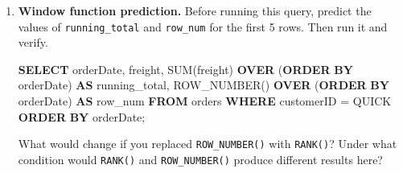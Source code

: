 \documentclass[
  letterpaper,
  DIV=11,
  numbers=noendperiod]{scrreprt}
\newenvironment{Shaded}{\begin{snugshade}}{\end{snugshade}}
\newcommand{\FunctionTok}[1]{\textcolor[rgb]{0.28,0.35,0.67}{#1}}
\newcommand{\KeywordTok}[1]{\textcolor[rgb]{0.00,0.23,0.31}{\textbf{#1}}}
\newcommand{\NormalTok}[1]{\textcolor[rgb]{0.00,0.23,0.31}{#1}}
\newcommand{\OperatorTok}[1]{\textcolor[rgb]{0.37,0.37,0.37}{#1}}
\newcommand{\StringTok}[1]{\textcolor[rgb]{0.13,0.47,0.30}{#1}}
\begin{document}
\begin{enumerate}
  \begin{codelisting}

  \caption{\texttt{duckdb}}

\begin{Shaded}
\begin{Highlighting}[]
\KeywordTok{SELECT}
\NormalTok{    c.categoryName,}
\NormalTok{    p.productName,}
    \FunctionTok{MAX}\NormalTok{(p.unitPrice) }\KeywordTok{AS}\NormalTok{ max\_price}
\KeywordTok{FROM}\NormalTok{ products }\KeywordTok{AS}\NormalTok{ p}
\KeywordTok{INNER} \KeywordTok{JOIN}\NormalTok{ categories }\KeywordTok{AS}\NormalTok{ c }\KeywordTok{ON}\NormalTok{ p.categoryID }\OperatorTok{=}\NormalTok{ c.categoryID}
\KeywordTok{GROUP} \KeywordTok{BY}\NormalTok{ c.categoryName, p.productName}
\KeywordTok{ORDER} \KeywordTok{BY}\NormalTok{ max\_price }\KeywordTok{DESC}\NormalTok{;}
\end{Highlighting}
\end{Shaded}

  \end{codelisting}

  Write a corrected version using a window function, and explain why
  \texttt{GROUP\ BY} alone can't solve this problem cleanly.
\item
  \textbf{Window function prediction.} Before running this query,
  predict the values of \texttt{running\_total} and \texttt{row\_num}
  for the first 5 rows. Then run it and verify.

  \begin{codelisting}

  \caption{\texttt{duckdb}}

\begin{Shaded}
\begin{Highlighting}[]
\KeywordTok{SELECT}
\NormalTok{    orderDate,}
\NormalTok{    freight,}
    \FunctionTok{SUM}\NormalTok{(freight) }\KeywordTok{OVER}\NormalTok{ (}\KeywordTok{ORDER} \KeywordTok{BY}\NormalTok{ orderDate) }\KeywordTok{AS}\NormalTok{ running\_total,}
    \FunctionTok{ROW\_NUMBER}\NormalTok{() }\KeywordTok{OVER}\NormalTok{ (}\KeywordTok{ORDER} \KeywordTok{BY}\NormalTok{ orderDate) }\KeywordTok{AS}\NormalTok{ row\_num}
\KeywordTok{FROM}\NormalTok{ orders}
\KeywordTok{WHERE}\NormalTok{ customerID }\OperatorTok{=} \StringTok{\textquotesingle{}QUICK\textquotesingle{}}
\KeywordTok{ORDER} \KeywordTok{BY}\NormalTok{ orderDate;}
\end{Highlighting}
\end{Shaded}

  \end{codelisting}

  What would change if you replaced \texttt{ROW\_NUMBER()} with
  \texttt{RANK()}? Under what condition would \texttt{RANK()} and
  \texttt{ROW\_NUMBER()} produce different results here?
\end{enumerate}
\end{document}
